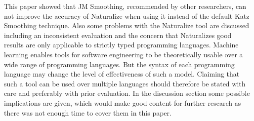 This paper showed that JM Smoothing, recommended by other researchers, can not improve the accuracy of Naturalize when using it instead of the default Katz Smoothing technique. Also some problems with the Naturalize tool are discussed including an inconsistent evaluation and the concern that Naturalizes good results are only applicable to strictly typed programming languages. Machine learning enables tools for software engineering to be theoretically usable over a wide range of programming languages. But the syntax of each programming language may change the level of effectiveness of such a model. Claiming that such a tool can be used over multiple languages should therefore be stated with care and preferably with prior evaluation. In the discussion section some possible implications are given, which would make good content for further research as there was not enough time to cover them in this paper.